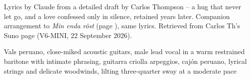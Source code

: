 
\label{sec:kvar-i-mig}
\begin{notes}
Lyrics by Claude from a detailed draft by Carlos Thompson -- a hug that never let go, and a love confessed only in silence, retained years later. Companion arrangement to \emph{Min enda röst} (page \pageref{sec:min-enda-rost}), same lyrics. Retrieved from Carlos Th's Suno page (V6-MINI, 22 September 2026).
\end{notes}
\begin{style}
Vals peruano, close-miked acoustic guitars, male lead vocal in a warm restrained baritone with intimate phrasing, guitarra criolla arpeggios, cajón peruano, lyrical strings and delicate woodwinds, lilting three-quarter sway at a moderate pace
\end{style}
